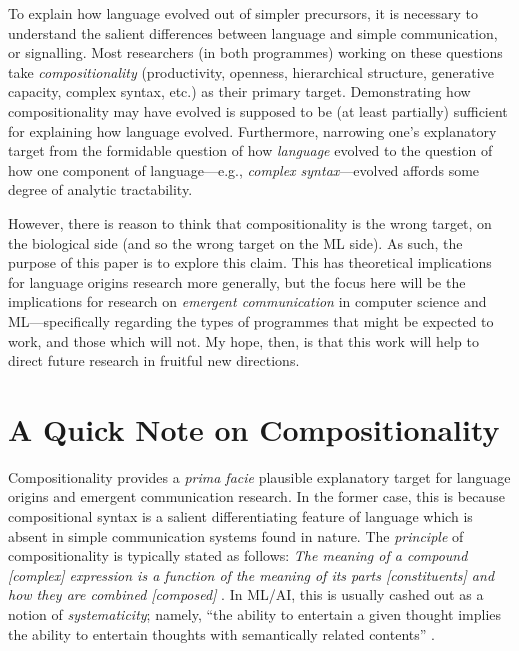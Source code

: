 \documentclass{article}
\begin{document}
To explain how language evolved out of simpler precursors, it is necessary to understand the salient differences between language and simple communication, or signalling. Most researchers (in both programmes) working on these questions take {\it compositionality} (productivity, openness, hierarchical structure, generative capacity, complex syntax, etc.) as their primary target. Demonstrating how compositionality may have evolved is supposed to be (at least partially) sufficient for explaining how language evolved. Furthermore, narrowing one's explanatory target from the formidable question of how {\it language} evolved to the question of how one component of language---e.g.,  {\it complex syntax}---evolved affords some degree of analytic tractability. 

However, there is reason to think that compositionality is the wrong target, on the biological side (and so the wrong target on the ML side). As such, the purpose of this paper is to explore this claim. %
This has theoretical implications for language origins research more generally, but the focus here will be the %
implications for research on {\it emergent communication} in computer science and ML---specifically regarding the types of programmes that might be expected to work, and those which will not. My hope, then, is that this work will help to direct future research in fruitful new directions. 

\section{A Quick Note on Compositionality}

Compositionality provides a {\it prima facie} plausible explanatory target for language origins and emergent communication research. In the former case, this is because compositional syntax is a salient differentiating feature of language which is absent in simple communication systems found in nature. The {\it principle} of compositionality is typically stated as follows: {\it The meaning of a compound [complex] expression is a function of the meaning of its parts [constituents] and how they are combined [composed]} \citep{Kamp-Partee-1995, Szabo-2012}. In ML/AI, this is usually cashed out as a notion of {\it systematicity}; namely, ``the ability to entertain a given thought implies the ability to entertain thoughts with semantically related contents'' \citep[3]{Fodor-Pylyshyn-1988}. 
\end{document}
